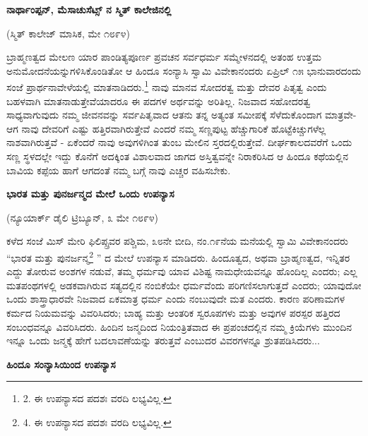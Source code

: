 \begin{center}
\textbf{ನಾರ್ಥಾಂಪ್ಪನ್, ಮೆಸಾಚುಸೆಟ್ಸ್ ನ ಸ್ಮಿತ್ ಕಾಲೇಜಿನಲ್ಲಿ}
\end{center}

\begin{center}
(ಸ್ಮಿತ್ ಕಾಲೇಜ್ ಮಾಸಿಕ, ಮೇ ೧೮೯೪)
\end{center}

ಬ್ರಾಹ್ಮಣತ್ವದ ಮೇಲಣ ಯಾರ ಪಾಂಡಿತ್ಯಪೂರ್ಣ ಪ್ರವಚನ ಸರ್ವಧರ್ಮ ಸಮ್ಮೇಳನದಲ್ಲಿ ಅತಂಹ ಉತ್ತಮ ಅನುಮೋದನೆಯನ್ನುಗಳಿಸಿಕೊಂಡಿತೋ ಆ ಹಿಂದೂ ಸಂನ್ಯಾಸಿ ಸ್ವಾಮಿ ವಿವೇಕಾನಂದರು ಏಪ್ರಿಲ್ ೧೫ ಭಾನುವಾರದಂದು ಸಂಜೆ ಪ್ರಾರ್ಥನಾವೇಳೆಯಲ್ಲಿ ಮಾತನಾಡಿದರು.\footnote{2. ಈ ಉಪನ್ಯಾಸದ ಪದಶಃ ವರದಿ ಲಭ್ಯವಿಲ್ಲ.} ನಾವು ಮಾನವ ಸೋದರತ್ವ ಮತ್ತು ದೇವರ ಪಿತೃತ್ವ ಎಂದು ಬಹಳವಾಗಿ ಮಾತನಾಡುತ್ತೇವೆಯಾದರೂ ಈ ಪದಗಳ ಅರ್ಥವನ್ನು ಅರಿತಿಲ್ಲ. ನಿಜವಾದ ಸಹೋದರತ್ವ ಸಾಧ್ಯವಾಗುವುದು ನಮ್ಮ ಜೀವನವನ್ನು ಸರ್ವಪಿತೃವಾದ ಆತನು ತನ್ನ ಅತ್ಯಂತ ಸಮೀಪಕ್ಕೆ ಸೆಳೆದುಕೊಂದಾಗ ಮಾತ್ರವೇ- ಆಗ ನಾವು ದೇವರಿಗೆ ಎಷ್ಟು ಹತ್ತಿರವಾಗಿರುತ್ತೇವೆ ಎಂದರೆ ನಮ್ಮ ಸಣ್ಣಪುಟ್ಟ ಹೆಚ್ಚುಗಾರಿಕೆ ಹೊಟ್ಟೆಕಿಚ್ಚುಗಳೆಲ್ಲ ನಾಶವಾಗಿರುತ್ತವೆ - ಏಕೆಂದರೆ ನಾವು ಅವುಗಳಿಗಿಂತ ತುಂಬ ಮೇಲಿನ ಸ್ತರದಲ್ಲಿರುತ್ತೇವೆ. ದೀರ್ಘಕಾಲದವರೆಗೆ ಒಂದು ಸಣ್ಣ ಸ್ಥಳದಲ್ಲೇ ಇದ್ದು ಕೊನೆಗೆ ಅದಕ್ಕಿಂತ ವಿಶಾಲವಾದ ಜಾಗದ ಅಸ್ತಿತ್ವವನ್ನೇ ನಿರಾಕರಿಸಿದ ಆ ಹಿಂದೂ ಕಥೆಯಲ್ಲಿನ ಬಾವಿಯ ಕಪ್ಪೆಯ ಹಾಗೆ ಆಗದಂತೆ ನಮ್ಮ ಬಗ್ಗೆ ನಾವು ಎಚ್ಚರ ವಹಿಸಬೇಕು.

\begin{center}
\textbf{ಭಾರತ ಮತ್ತು ಪುನರ್ಜನ್ಮದ ಮೇಲೆ ಒಂದು ಉಪನ್ಯಾಸ}
\end{center}

\begin{center}
(ನ್ಯೂಯಾರ್ಕ್ ಡೈಲಿ ಟ್ರಿಬ್ಯೂನ್, ೩ ಮೇ ೧೮೯೪)
\end{center}

ಕಳೆದ ಸಂಜೆ ಮಿಸ್ ಮೇರಿ ಫಿಲಿಪ್ಸ್ರವರ ಪಶ್ಚಿಮ, ೩೮ನೇ ಬೀದಿ, ನಂ.೧೯ನೆಯ ಮನೆಯಲ್ಲಿ ಸ್ವಾಮಿ ವಿವೇಕಾನಂದರು  “ಭಾರತ ಮತ್ತು ಪುನರ್ಜನ್ಮ\footnote{4. ಈ ಉಪನ್ಯಾಸದ ಪದಶಃ ವರದಿ ಲಭ್ಯವಿಲ್ಲ.} ” ದ ಮೇಲೆ ಉಪನ್ಯಾಸ ಮಾಡಿದರು. ಹಿಂದೂತ್ವದ, ಅಥವಾ ಬ್ರಾಹ್ಮಣತ್ವದ, ಇನ್ನಿತರ ಎದ್ದು ತೋರುವ ಅಂಶಗಳ ನಡುವೆ, ತಮ್ಮ ಧರ್ಮವು ಯಾವ ವಿಶಿಷ್ಟ ನಾಮಧೇಯವನ್ನೂ ಹೊಂದಿಲ್ಲ ಎಂದರು; ಎಲ್ಲ ಮತಪಂಥಗಳಲ್ಲಿ ಅಡಕವಾಗಿರುವ ಸತ್ಯದಲ್ಲಿನ ನಂಬಿಕೆಯೇ ಧರ್ಮವೆಂದು ಪರಿಗಣಿಸಲಾಗುತ್ತದೆ ಎಂದರು; ಯಾವುದೋ ಒಂದು ಶಾಸ್ತ್ರಾಧಾರವೇ ನಿಜವಾದ ಏಕಮಾತ್ರ ಧರ್ಮ ಎಂದು ನಂಬುವುದೇ ಮತ ಎಂದರು. ಕಾರಣ ಪರಿಣಾಮಗಳ ಕರ್ಮದ ನಿಯಮವನ್ನು ವಿವರಿಸಿದರು; ಬಾಹ್ಯ ಮತ್ತು ಆಂತರಿಕ ಸ್ವರೂಪಗಳು ಮತ್ತು ಅವುಗಳ ಪರಸ್ಪರ ಹತ್ತಿರದ ಸಂಬಂಧವನ್ನೂ ವಿವರಿಸಿದರು. ಹಿಂದಿನ ಜನ್ಮದಿಂದ ನಿಯಂತ್ರಿತವಾದ ಈ ಪ್ರಪಂಚದಲ್ಲಿನ ನಮ್ಮ ಕ್ರಿಯೆಗಳು ಮುಂದಿನ ಇನ್ನೂ ಒಂದು ಜನ್ಮಕ್ಕೆ ಹೇಗೆ ಬದಲಾವಣೆಯನ್ನು ತರುತ್ತವೆ ಎಂಬುದರ ವಿವರಗಳನ್ನೂ ಶ್ರುತಪಡಿಸಿದರು...

\begin{center}
\textbf{ಹಿಂದೂ ಸಂನ್ಯಾಸಿಯಿಂದ ಉಪನ್ಯಾಸ}
\end{center}

